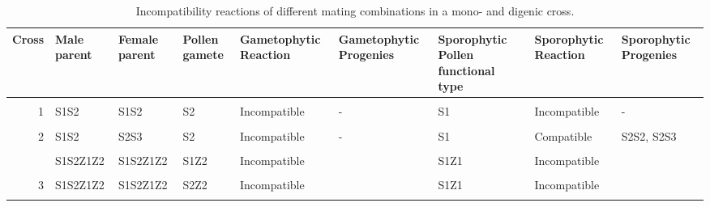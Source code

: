 \documentclass[11pt,ignorenonframetext,aspectratio=169]{beamer}
\begin{document}
\begin{frame}{}
\protect\hypertarget{section-8}{}
\begin{table}

\caption{\label{tab:si-comparison-reaction1}Incompatibility reactions of different mating combinations in a mono- and digenic cross.}
\centering
\fontsize{6}{8}\selectfont
\begin{tabular}[t]{r>{\raggedright\arraybackslash}p{4em}>{\raggedright\arraybackslash}p{4em}>{\raggedright\arraybackslash}p{4em}>{\raggedright\arraybackslash}p{6em}>{\raggedright\arraybackslash}p{8em}>{\raggedright\arraybackslash}p{8em}>{\raggedright\arraybackslash}p{6em}>{\raggedright\arraybackslash}p{8em}}
\toprule
Cross & Male parent & Female parent & Pollen gamete & Gametophytic Reaction & Gametophytic Progenies & Sporophytic Pollen functional type & Sporophytic Reaction & Sporophytic Progenies\\
\midrule
\cellcolor{gray!6}{1} & \cellcolor{gray!6}{S1S2} & \cellcolor{gray!6}{S1S2} & \cellcolor{gray!6}{S1} & \cellcolor{gray!6}{Incompatible} & \cellcolor{gray!6}{-} & \cellcolor{gray!6}{S1} & \cellcolor{gray!6}{Incompatible} & \cellcolor{gray!6}{-}\\
1 & S1S2 & S1S2 & S2 & Incompatible & - & S1 & Incompatible & -\\
\cellcolor{gray!6}{2} & \cellcolor{gray!6}{S1S2} & \cellcolor{gray!6}{S2S3} & \cellcolor{gray!6}{S1} & \cellcolor{gray!6}{Compatible} & \cellcolor{gray!6}{S1S2, S1S3} & \cellcolor{gray!6}{S1} & \cellcolor{gray!6}{Compatible} & \cellcolor{gray!6}{S1S2, S1S3}\\
2 & S1S2 & S2S3 & S2 & Incompatible & - & S1 & Compatible & S2S2, S2S3\\
\cellcolor{gray!6}{3} & \cellcolor{gray!6}{S1S2Z1Z2} & \cellcolor{gray!6}{S1S2Z1Z2} & \cellcolor{gray!6}{S1Z1} & \cellcolor{gray!6}{Incompatible} & \cellcolor{gray!6}{} & \cellcolor{gray!6}{S1Z1} & \cellcolor{gray!6}{Incompatible} & \cellcolor{gray!6}{}\\
\addlinespace
3 & S1S2Z1Z2 & S1S2Z1Z2 & S1Z2 & Incompatible &  & S1Z1 & Incompatible & \\
\cellcolor{gray!6}{3} & \cellcolor{gray!6}{S1S2Z1Z2} & \cellcolor{gray!6}{S1S2Z1Z2} & \cellcolor{gray!6}{S2Z1} & \cellcolor{gray!6}{Incompatible} & \cellcolor{gray!6}{} & \cellcolor{gray!6}{S1Z1} & \cellcolor{gray!6}{Incompatible} & \cellcolor{gray!6}{}\\
3 & S1S2Z1Z2 & S1S2Z1Z2 & S2Z2 & Incompatible &  & S1Z1 & Incompatible & \\
\cellcolor{gray!6}{4} & \cellcolor{gray!6}{S1S2Z1Z3} & \cellcolor{gray!6}{S1S2Z1Z2} & \cellcolor{gray!6}{S1Z1} & \cellcolor{gray!6}{Incompatible} & \cellcolor{gray!6}{} & \cellcolor{gray!6}{S1Z1} & \cellcolor{gray!6}{Incompatible} & \cellcolor{gray!6}{}\\

\end{tabular}
\end{table}
\end{frame}
\end{document}

